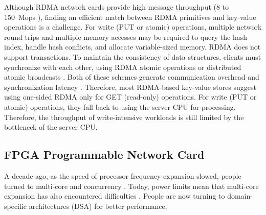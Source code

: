 Although RDMA network cards provide high message throughput (8 to 150~Mops \cite {kalia2016design}), finding an efficient match between RDMA primitives and key-value operations is a challenge. For write (PUT or atomic) operations, multiple network round trips and multiple memory accesses may be required to query the hash index, handle hash conflicts, and allocate variable-sized memory. RDMA does not support transactions. To maintain the consistency of data structures, clients must synchronize with each other, using RDMA atomic operations or distributed atomic broadcasts \cite{szepesi2014designing}. Both of these schemes generate communication overhead and synchronization latency \cite {mitchell2013using,dragojevic2014farm}. Therefore, most RDMA-based key-value stores \cite {mitchell2013using,dragojevic2014farm,kalia2014using} suggest using one-sided RDMA only for GET (read-only) operations. For write (PUT or atomic) operations, they fall back to using the server CPU for processing. Therefore, the throughput of write-intensive workloads is still limited by the bottleneck of the server CPU.

\iffalse
\subsection{FPGA Programmable Network Card}
\label{kvdirect:sec:programmable-nic}

A decade ago, as the speed of processor frequency expansion slowed, people turned to multi-core and concurrency \cite {sutter2005free}. Today, power limits mean that multi-core expansion has also encountered difficulties \cite {esmaeilzadeh2013power}. People are now turning to domain-specific architectures (DSA) for better performance.


